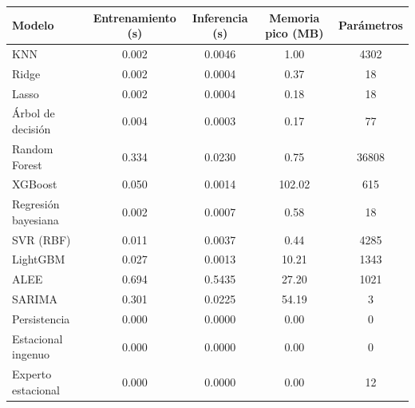 \begin{tabular}{lcccc}
\toprule
Modelo & Entrenamiento (s) & Inferencia (s) & Memoria pico (MB) & Parámetros \\
\midrule
KNN & 0.002 & 0.0046 & 1.00 & 4302 \\
Ridge & 0.002 & 0.0004 & 0.37 & 18 \\
Lasso & 0.002 & 0.0004 & 0.18 & 18 \\
Árbol de decisión & 0.004 & 0.0003 & 0.17 & 77 \\
Random Forest & 0.334 & 0.0230 & 0.75 & 36808 \\
XGBoost & 0.050 & 0.0014 & 102.02 & 615 \\
Regresión bayesiana & 0.002 & 0.0007 & 0.58 & 18 \\
SVR (RBF) & 0.011 & 0.0037 & 0.44 & 4285 \\
LightGBM & 0.027 & 0.0013 & 10.21 & 1343 \\
ALEE & 0.694 & 0.5435 & 27.20 & 1021 \\
SARIMA & 0.301 & 0.0225 & 54.19 & 3 \\
Persistencia & 0.000 & 0.0000 & 0.00 & 0 \\
Estacional ingenuo & 0.000 & 0.0000 & 0.00 & 0 \\
Experto estacional & 0.000 & 0.0000 & 0.00 & 12 \\
\bottomrule
\end{tabular}